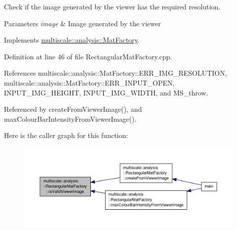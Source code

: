 Check if the image generated by the viewer has the required resolution. 


\begin{DoxyParams}{Parameters}
{\em image} & Image generated by the viewer \\
\hline
\end{DoxyParams}


Implements \hyperlink{classmultiscale_1_1analysis_1_1MatFactory_ad6acdd120b128eb9fb502fca23a7de69}{multiscale\-::analysis\-::\-Mat\-Factory}.



Definition at line 46 of file Rectangular\-Mat\-Factory.\-cpp.



References multiscale\-::analysis\-::\-Mat\-Factory\-::\-E\-R\-R\-\_\-\-I\-M\-G\-\_\-\-R\-E\-S\-O\-L\-U\-T\-I\-O\-N, multiscale\-::analysis\-::\-Mat\-Factory\-::\-E\-R\-R\-\_\-\-I\-N\-P\-U\-T\-\_\-\-O\-P\-E\-N, I\-N\-P\-U\-T\-\_\-\-I\-M\-G\-\_\-\-H\-E\-I\-G\-H\-T, I\-N\-P\-U\-T\-\_\-\-I\-M\-G\-\_\-\-W\-I\-D\-T\-H, and M\-S\-\_\-throw.



Referenced by create\-From\-Viewer\-Image(), and max\-Colour\-Bar\-Intensity\-From\-Viewer\-Image().



Here is the caller graph for this function\-:
\nopagebreak
\begin{figure}[H]
\begin{center}
\leavevmode
\includegraphics[width=350pt]{classmultiscale_1_1analysis_1_1RectangularMatFactory_a398913bbfa8ca9d80cb630c29a37a135_icgraph}
\end{center}
\end{figure}


